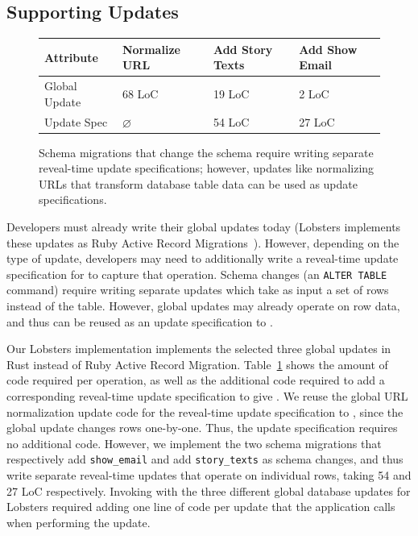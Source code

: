 \subsection{Supporting Updates}
\begin{figure}
    \centering
    \begin{tabular}{m{}|m{}|m{}|m{}}
        \centering\textbf{Attribute} & \textbf{Normalize URL} & \textbf{Add Story Texts} &
        \textbf{Add Show Email} \\
        \hline
        Global Update & 68 LoC & 19 LoC & 2 LoC \\
        \hline
        Update Spec & $\varnothing$ & 54 LoC & 27 LoC \\
    \end{tabular}
    \caption[Code required to write reveal-time update specifications.]{Schema
    migrations that change the schema require
    writing separate reveal-time update specifications; however, updates like
    normalizing URLs that transform database table data can be used as update
    specifications.}
    \label{tab:updates}
\end{figure}

Developers must already write their global updates today (\eg Lobsters
implements these updates as Ruby Active Record Migrations~\cite{ruby_arm}). 
%
However, depending on the type of update, developers may need to additionally
write a reveal-time update specification for \sys to capture that operation.
%
Schema changes (\eg an \texttt{ALTER TABLE} command) require writing separate
updates which take as input a set of rows instead of the table.
%
However, global updates may already operate on row data, and thus
can be reused as an update specification to \sys.


%
Our Lobsters implementation implements the selected three global
updates in
Rust instead of Ruby Active Record Migration. Table~\ref{tab:updates} shows the
amount of code required per operation, as well as the additional code required
to add a corresponding reveal-time update specification to give \sys. We reuse
the global URL normalization update code for the reveal-time update
specification to \sys, since the global update changes rows one-by-one. Thus,
the update specification requires no additional code.
%
However, we implement the two schema migrations that respectively add
\texttt{show\_email} and add \texttt{story\_texts} as schema changes, and
thus write separate reveal-time updates that operate on individual rows, taking
54 and 27 LoC respectively.
%
%
Invoking \sys with the three different global database updates for Lobsters
required adding one line of code per update that the application calls when
performing the update. 
%

